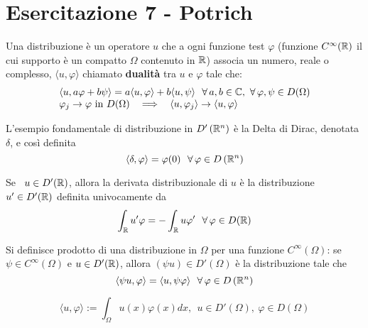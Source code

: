 \chapter{Esercitazione 7 - Potrich}
\ParteEsercizi
\begin{defn}
[Distribuzione] Una distribuzione è un operatore $u$ che a ogni funzione test $\varphi $ (funzione $C^{\infty }(\mathbb{R} )$ il cui supporto è un compatto $\Omega $ contenuto in $\mathbb{R} $) associa un numero, reale o complesso, $\langle u,\varphi \rangle $ chiamato \textbf{dualità} tra $u$ e $\varphi $ tale che:
\begin{equation*}
\begin{array}{ l }
\langle u,a\varphi +b\psi \rangle =a\langle u,\varphi \rangle +b\langle u,\psi \rangle \ \ \forall a,b\in \CC  ,\ \forall \varphi ,\psi \in D( \Omega )\\
\varphi _{j}\rightarrow \varphi \ \text{in} \ D( \Omega ) \ \ \implies \ \ \langle u,\varphi _{j} \rangle \rightarrow \langle u,\varphi \rangle 
\end{array}
\end{equation*}
\end{defn}
\begin{rem}
 L'esempio fondamentale di distribuzione in $D'\left(\mathbb{R} ^{n}\right)$ è la Delta di Dirac, denotata $\delta $, e così definita
\begin{equation*}
\langle \delta ,\varphi \rangle =\varphi ( 0) \ \ \forall \varphi \in D\left(\RR ^{n}\right)
\end{equation*}
\end{rem}
\begin{defn}
Se \ $u\in D'(\mathbb{R} )$, allora la derivata distribuzionale di $u$ è la distribuzione $u'\in D'(\mathbb{R} )$ definita univocamente da
\begin{equation*}
\int _{\RR } u'\varphi =-\int _{\RR } u\varphi '\ \ \forall \varphi \in D(\RR )
\end{equation*}
\end{defn}
\begin{defn}
Si definisce prodotto di una distribuzione in $\Omega $ per una funzione $C^{\infty }( \Omega )$: se $\psi \in C^{\infty }( \Omega )$ e $u\in D'(\mathbb{R} )$, allora $( \psi u) \in D'( \Omega )$ è la distribuzione tale che
\begin{equation*}
\langle \psi u,\varphi \rangle =\langle u,\psi \varphi \rangle \ \ \forall \varphi \in D\left(\RR ^{n}\right)
\end{equation*}
\end{defn}
\begin{rem}
\begin{equation*}
\langle u,\varphi \rangle :=\int _{\Omega } u( x) \varphi ( x) dx,\ \ u\in D'( \Omega ) ,\ \varphi \in D( \Omega )
\end{equation*}
\end{rem}
\Esercizio{}

